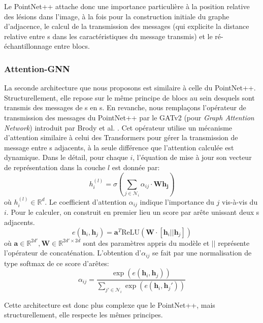 Le PointNet++ attache donc une importance particulière à la position relative des lésions dans l'image, à la fois pour la construction initiale du graphe d'adjacence, le calcul de la transmission des messages (qui explicite la distance relative entre \noeud{}s dans les caractéristiques du message transmis) et le ré-échantillonnage entre blocs.

\subsubsection{Attention-GNN}
La seconde architecture que nous proposons est similaire à celle du PointNet++. Structurellement, elle repose sur le même principe de blocs au sein desquels sont transmis des messages de \noeud{}s en \noeud{}s. En revanche, nous remplaçons l'opérateur de transmission des messages du PointNet++ par le GATv2 (pour \textit{Graph Attention Network}) introduit par Brody et al. \cite{brody2022how}. Cet opérateur utilise un mécanisme d'attention similaire à celui des Transformers \cite{NIPS2017_3f5ee243} pour gérer la transmission de message entre \noeud{}s adjacents, à la seule différence que l'attention calculée est dynamique. 
Dans le détail, pour chaque \noeud{} $i$, l'équation de mise à jour son vecteur de représentation dans la couche $l$ est donnée par:
\begin{equation}
	h^{(l)}_i = \sigma(\sum_{j \in \mathcal{N}_i} \alpha_{ij}\cdot \mathbf{W}\mathbf{h_j})
\end{equation}
où $h^{(l)}_i \in \mathbb{R}^d$.
Le coefficient d'attention $\alpha_{ij}$ indique l'importance du \noeud{} $j$ vis-à-vis du \noeud{} $i$. Pour le calculer, on construit en premier lieu un score par arête unissant deux \noeud{}s adjacents.
\begin{equation}
	e(\mathbf{h}_i, \mathbf{h}_j) = \mathbf{a}^T \text{ReLU}(\mathbf{W}\cdot\left[\mathbf{h}_i || \mathbf{h}_j\right] )
\end{equation}
où $\mathbf{a} \in \mathbb{R}^{2d'}, \mathbf{W} \in \mathbb{R}^{2d'\times 2d}$ sont des paramètres appris du modèle et $||$ représente l'opérateur de concaténation. L'obtention d'$\alpha_{ij}$ se fait par une normalisation de type softmax de ce score d'arêtes:
\begin{equation}
	\alpha_{ij} = \frac{\exp(e(\mathbf{h}_i, \mathbf{h}_j))}{\sum_{j' \in \mathcal{N}_i} \exp(e(\mathbf{h}_i, \mathbf{h}_j'))}
\end{equation}

Cette architecture est donc plus complexe que le PointNet++, mais structurellement, elle respecte les mêmes principes.

